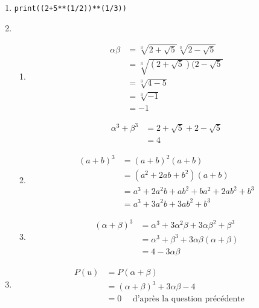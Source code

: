 \documentclass[a4paper, 11pt,reqno]{article}
\begin{document}
\begin{correction}
\begin{enumerate}
\item \begin{lstlisting}
print((2+5**(1/2))**(1/3))
\end{lstlisting}
\item \begin{enumerate}
\item \begin{align*}
\alpha \beta &= \sqrt[3]{2+\sqrt{5}}\sqrt[3]{2-\sqrt{5}}\\
					&=\sqrt[3]{(2+\sqrt{5})(2-\sqrt{5}}\\
					&=\sqrt[3]{4-5}\\
					&=\sqrt[3]{-1}\\					
					&=-1
\end{align*}

\begin{align*}
\alpha^3+\beta^3&= 2+\sqrt{5}+2-\sqrt{5}\\
							&=4
\end{align*}


\item 
\begin{align*}
(a+b)^3&=(a+b)^2(a+b)\\
			&=(a^2+2ab+b^2)(a+b)\\
			&=a^3+2a^2b+ab^2+ba^2+2ab^2+b^3\\
			&=a^3+3a^2b+3ab^2+b^3
\end{align*}

\item 
\begin{align*}
(\alpha+\beta)^3& = \alpha^3 +3\alpha^2\beta +3\alpha \beta^2 +\beta^3\\
&=\alpha^3  +\beta^3 +3\alpha\beta(\alpha + \beta)\\
&=4-3\alpha\beta
\end{align*}
\end{enumerate}
\item 
\begin{align*}
P(u) &= P(\alpha+\beta) \\
	&= (\alpha+\beta)^3+3\alpha\beta -4\\
	&=0 \quad \text{ d'après la question précédente}
\end{align*}



\end{enumerate}
\end{correction}
\end{document}
